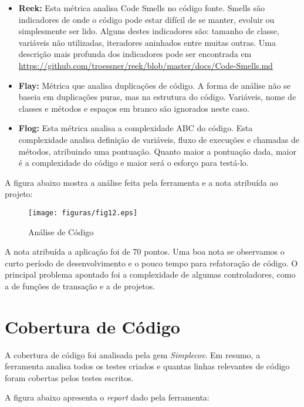 \begin{itemize}
  \item \textbf{Reek:} Esta métrica analisa Code Smells no código fonte. Smells são indicadores de onde o código pode estar difícil de se manter, evoluir ou simplesmente ser lido. Alguns destes indicadores são: tamanho de classe, variáveis não utilizadas, iteradores aninhados entre muitas outras. Uma descrição mais profunda dos indicadores pode ser encontrada em \url{https://github.com/troessner/reek/blob/master/docs/Code-Smells.md}

  \item \textbf{Flay:} Métrica que analisa duplicações de código. A forma de análise não se baseia em duplicações puras, mas na estrutura do código. Variáveis, nome de classes e métodos e espaços em branco são ignorados neste caso.

  \item \textbf{Flog:} Esta métrica analisa a complexidade ABC do código. Esta complexidade analisa definição de variáveis, fluxo de execuções e chamadas de métodos, atribuindo uma pontuação. Quanto maior a pontuação dada, maior é a complexidade do código e maior será o esforço para testá-lo.

\end{itemize}

A figura abaixo mostra a análise feita pela ferramenta e a nota atribuída ao projeto:

\begin{figure}[]
	\centering
	\texttt{[image: figuras/fig12.eps]}
	\caption{Análise de Código}
	\label{fig12}
\end{figure}

A nota atribuída a aplicação foi de 70 pontos. Uma boa nota se observamos o curto período de desenvolvimento e o pouco tempo para refatoração de código. O principal problema apontado foi a complexidade de algumas controladores, como a de funções de transação e a de projetos.

\section{Cobertura de Código}

A cobertura de código foi analisada pela gem \textit{Simplecov}. Em resumo, a ferramenta analisa todos os testes criados e quantas linhas relevantes de código foram cobertas pelos testes escritos.

A figura abaixo apresenta o \textit{report} dado pela ferramenta:

